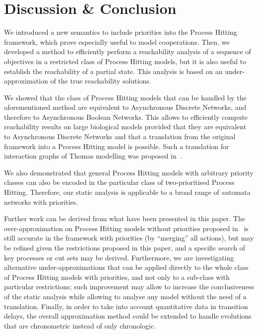 \section{Discussion \& Conclusion}\label{sec:ccl}

We introduced a new semantics to include priorities into the Process Hitting framework, which prove especially useful to model cooperations.
Then, we developed a method to efficiently perform a reachability analysis of a sequence of objectives in a restricted class of Process Hitting models,
but it is also useful to establish the reachability of a partial state.
This analysis is based on an under-approximation of the true reachability solutions.

We showed that the class of Process Hitting models that can be handled by the aforementioned method are equivalent to Asynchronous Discrete Networks, and therefore to Asynchronous Boolean Networks.
This allows to efficiently compute reachability results on large biological models provided that they are equivalent to Asynchronous Discrete Networks and that a translation from the original framework into a Process Hitting model is possible.
Such a translation for interaction graphs of Thomas modelling was proposed in~\cite{PMR10-TCSB}. %

We also demonstrated that general Process Hitting models with arbitrary priority
classes can also be encoded in the particular class of two-prioritised Process Hitting.
Therefore, our static analysis is applicable to a broad range of automata
networks with priorities.

Further work can be derived from what have been presented in this paper.
The over-approximation on Process Hitting models without priorities proposed in~\cite{PMR12-MSCS}
is still accurate in the framework with priorities (by “merging” all actions),
but may be refined given the restrictions proposed in this paper,
and a specific search of key processes or cut sets may be derived.
Furthermore, we are investigating alternative under-approximations that can be
applied directly to the whole class of Process Hitting models with priorities,
and not only to a sub-class with particular restrictions;
such improvement may allow to increase the conclusiveness of the static analysis
while allowing to analyse any model without the need of a translation.
Finally, in order to take into account quantitative data in transition delays, the overall approximation method could be extended to handle evolutions that are chronometric instead of only chronologic.
